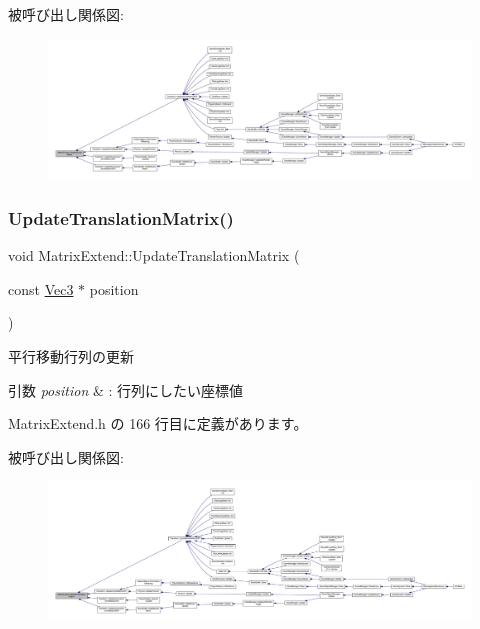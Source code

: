 被呼び出し関係図\+:
\nopagebreak
\begin{figure}[H]
\begin{center}
\leavevmode
\includegraphics[width=350pt]{class_matrix_extend_afc536ab192cd6ef2b9a93861af5bf005_icgraph}
\end{center}
\end{figure}
\mbox{\label{class_matrix_extend_a6ca471ad3fea88a84fde7623c84f52f6}} 
\subsubsection{\texorpdfstring{Update\+Translation\+Matrix()}{UpdateTranslationMatrix()}}
{\footnotesize\ttfamily void Matrix\+Extend\+::\+Update\+Translation\+Matrix (\begin{DoxyParamCaption}\item[{const \mbox{\hyperlink{_vector3_d_8h_ab16f59e4393f29a01ec8b9bbbabbe65d}{Vec3}} $\ast$}]{position }\end{DoxyParamCaption})\hspace{0.3cm}{\ttfamily [inline]}}



平行移動行列の更新 


\begin{DoxyParams}{引数}
{\em position} & \+: 行列にしたい座標値 \\
\hline
\end{DoxyParams}


 Matrix\+Extend.\+h の 166 行目に定義があります。

被呼び出し関係図\+:
\nopagebreak
\begin{figure}[H]
\begin{center}
\leavevmode
\includegraphics[width=350pt]{class_matrix_extend_a6ca471ad3fea88a84fde7623c84f52f6_icgraph}
\end{center}
\end{figure}
\mbox{\label{class_matrix_extend_a81e92fe4305ff9569809b61e2e92df31}} 

